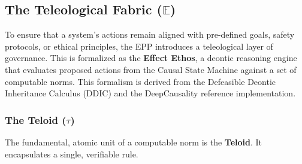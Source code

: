 \newpage


\subsection[The Teloid and Effect Ethos]{The Teleological Fabric (\(\mathbb{E}\))}
\label{sec:formalization_ethos}

To ensure that a system's actions remain aligned with pre-defined goals, safety protocols, or ethical principles, the EPP introduces a teleological layer of governance. This is formalized as the \textbf{Effect Ethos}, a deontic reasoning engine that evaluates proposed actions from the Causal State Machine against a set of computable norms. This formalism is derived from the Defeasible Deontic Inheritance Calculus (DDIC) \cite{olson2024DDIC} and the DeepCausality reference implementation.

\subsubsection[The Teloid (tau)]{The Teloid (\(\tau\))}
\label{ssec:teloid_formal}

The fundamental, atomic unit of a computable norm is the \textbf{Teloid}. It encapsulates a single, verifiable rule.\newline


